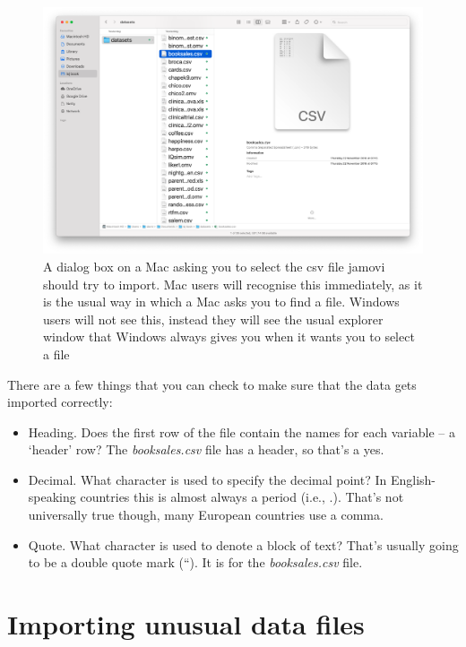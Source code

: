 \documentclass[
  a4paper,
]{book}
\providecommand{\tightlist}{%
  \setlength{\itemsep}{0pt}\setlength{\parskip}{0pt}}\usepackage{longtable,booktabs,array}
\begin{document}
\begin{figure}

\includegraphics[width=1\textwidth,height=\textheight]{images/fig3-5.png} \hfill{}

\caption{\label{fig-fig3-5}A dialog box on a Mac asking you to select
the csv file jamovi should try to import. Mac users will recognise this
immediately, as it is the usual way in which a Mac asks you to find a
file. Windows users will not see this, instead they will see the usual
explorer window that Windows always gives you when it wants you to
select a file}

\end{figure}

There are a few things that you can check to make sure that the data
gets imported correctly:

\begin{itemize}
\tightlist
\item
  Heading. Does the first row of the file contain the names for each
  variable -- a `header' row? The \emph{booksales.csv} file has a
  header, so that's a yes.
\item
  Decimal. What character is used to specify the decimal point? In
  English-speaking countries this is almost always a period (i.e., .).
  That's not universally true though, many European countries use a
  comma.
\item
  Quote. What character is used to denote a block of text? That's
  usually going to be a double quote mark (``). It is for the
  \emph{booksales.csv} file.
\end{itemize}

\hypertarget{importing-unusual-data-files}{%
\section{Importing unusual data
files}\label{importing-unusual-data-files}}
\end{document}

